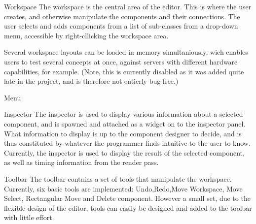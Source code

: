 Workspace
The workspace is the central area of the editor. This is where the user creates, and otherwise manipulate the components and their connections. The user selects and adds components from a list of sub-classes from a drop-down menu, accessible by right-cllicking the workspace area. 

Several workspace layouts can be loaded in memory simultaniously, wich enables users to test several concepts at once, against servers with different hardware capabilities, for example. (Note, this is currently disabled as it was added quite late in the project, and is therefore not entierly bug-free.)

Menu

Inspector
The inspector is used to display various information about a selected component, and is spawned and attached as a widget on to the inspector panel. What information to display is up to the component designer to decide, and is thus constituted by whatever the programmer finds intuitive to the user to know. Currently, the inspector is used to display the result of the selected component, as well as timing information from the render pass.

Toolbar
The toolbar contains a set of tools that manipulate the workspace. Currently, six basic tools are implemented: Undo,Redo,Move Workspace, Move Select, Rectangular Move and Delete component. However a small set, due to the flexible design of the editor, tools can easily be designed and added to the toolbar with little effort. 
 